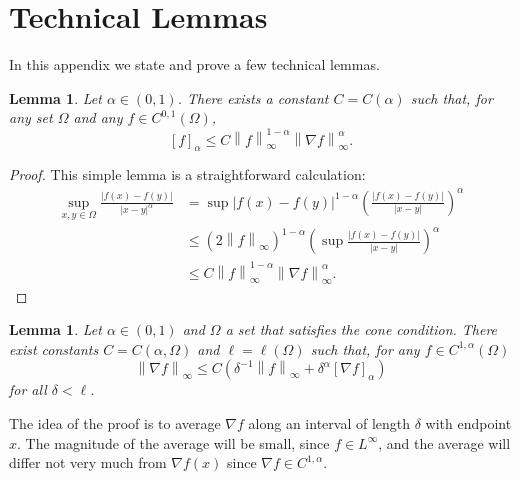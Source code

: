 \documentclass[11pt]{amsart}
\newtheorem{lemma}[theorem]{Lemma}
\theoremstyle{remark}
\theoremstyle{definition}
\newcommand{\norm}[1]{\left\lVert#1\right\rVert}
\newcommand{\paren}[1]{\left( #1 \right)}
\newcommand{\bracket}[1]{\left[ #1 \right]}
\newcommand{\grad}{\nabla}
\newcommand{\n}{^{-1}}
\begin{document}

\vskip1cm
\appendix
\section{Technical Lemmas} \label{sec:technical}

In this appendix we state and prove a few technical lemmas.  


\begin{lemma} \label{thm:interpolation C1 to holder}
Let $\alpha \in (0,1)$.  There exists a constant $C = C(\alpha)$ such that, for any set $\Omega$ and any $f \in C^{0,1}(\Omega)$,
\[ \bracket{f}_\alpha \leq C \norm{f}_\infty^{1-\alpha} \norm{\grad f}_\infty^\alpha. \]
\end{lemma}

\begin{proof}
This simple lemma is a straightforward calculation:
\begin{align*} 
\sup_{x,y \in \Omega} \frac{|f(x)-f(y)|}{|x-y|^\alpha} &= \sup |f(x)-f(y)|^{1-\alpha} \paren{\frac{|f(x)-f(y)|}{|x-y|}}^\alpha 
\\ &\leq \paren{2 \norm{f}_\infty}^{1-\alpha} \paren{ \sup \frac{|f(x)-f(y)|}{|x-y|} }^\alpha
\\ &\leq C \norm{f}_\infty^{1-\alpha} \norm{\grad f}_\infty^\alpha.
\end{align*}
\end{proof}

\begin{lemma} \label{thm:interpolation holder to C1}
Let $\alpha \in (0,1)$ and $\Omega$ a set that satisfies the cone condition.  There exist constants $C = C(\alpha, \Omega)$ and $\ell = \ell(\Omega)$ such that, for any $f \in C^{1,\alpha}(\Omega)$
\[ \norm{\grad f}_\infty \leq C \paren{ \delta\n \norm{f}_\infty  + \delta^\alpha \bracket{\grad f}_\alpha }\]
for all $\delta < \ell$.  
\end{lemma}

The idea of the proof is to average $\grad f$ along an interval of length $\delta$ with endpoint $x$.  The magnitude of the average will be small, since $f \in L^\infty$, and the average will differ not very much from $\grad f(x)$ since $\grad f \in C^{1,\alpha}$.  
\end{document}
